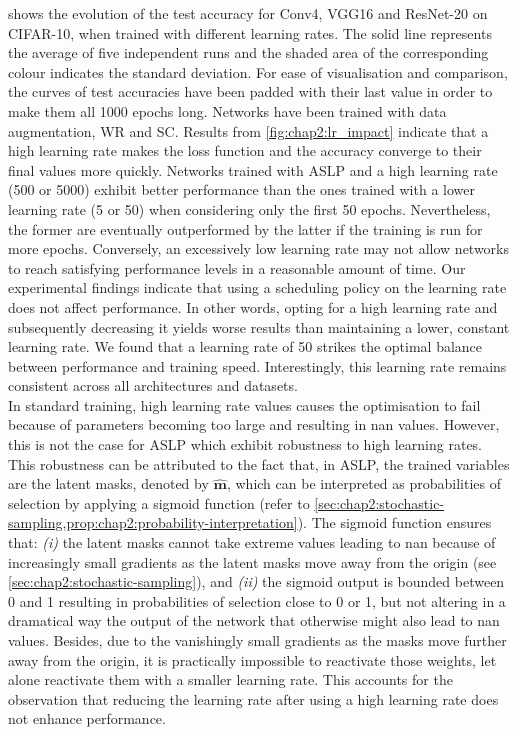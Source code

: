  shows the evolution of the test accuracy for Conv4,
VGG16 and ResNet-20 on CIFAR-10, when trained with different learning rates. The
solid line represents the average of five independent runs and the shaded area
of the corresponding colour indicates the standard deviation. For ease of
visualisation and comparison, the curves of test accuracies have been padded
with their last value in order to make them all 1000 epochs long. Networks have
been trained with data augmentation, \ac{WR} and \ac{SC}. Results from
\cref{fig:chap2:lr_impact} indicate that a high learning rate makes the loss
function and the accuracy converge to their final values more quickly. Networks
trained with \ac{ASLP} and a high learning rate (500 or 5000) exhibit better
performance than the ones trained with a lower learning rate (5 or 50) when
considering only the first 50 epochs. Nevertheless, the former are eventually
outperformed by the latter if the training is run for more epochs. Conversely,
an excessively low learning rate may not allow networks to reach satisfying
performance levels in a reasonable amount of time. Our experimental findings
indicate that using a scheduling policy on the learning rate does not affect
performance. In other words, opting for a high learning rate and subsequently
decreasing it yields worse results than maintaining a lower, constant learning
rate. We found that a learning rate of 50 strikes the optimal balance between
performance and training speed. Interestingly, this learning rate remains
consistent across all architectures and datasets.\\

In standard training, high learning rate values causes the optimisation to fail
because of parameters becoming too large and resulting in \ac{nan} values.
However, this is not the case for \ac{ASLP} which exhibit robustness to high
learning rates. This robustness can be attributed to the fact that, in
\ac{ASLP}, the trained variables are the latent masks, denoted by
$\bm{\hat{m}}$, which can be interpreted as probabilities of selection by
applying a sigmoid function (refer to
\cref{sec:chap2:stochastic-sampling,prop:chap2:probability-interpretation}). The
sigmoid function ensures that: \emph{(i)} the latent masks cannot take extreme
values leading to \ac{nan} because of increasingly small gradients as the latent
masks move away from the origin (see \cref{sec:chap2:stochastic-sampling}), and
\emph{(ii)} the sigmoid output is bounded between 0 and 1 resulting in
probabilities of selection close to 0 or 1, but not altering in a dramatical way
the output of the network that otherwise might also lead to \ac{nan} values.
Besides, due to the vanishingly small gradients as the masks move further away
from the origin, it is practically impossible to reactivate those weights, let
alone reactivate them with a smaller learning rate. This accounts for the
observation that reducing the learning rate after using a high learning rate
does not enhance performance.\\

